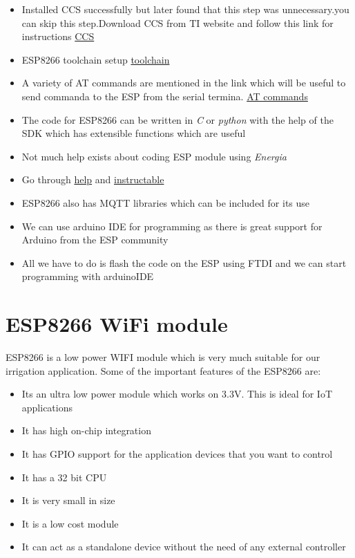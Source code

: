 \documentclass[16pt]{article}
\begin{document}
\begin{itemize}

\item
  Installed CCS successfully but later found that this step was unnecessary.you can skip this step.Download CCS from TI website and follow this link for instructions
  {\color{red}\href{http://processors.wiki.ti.com/index.php/Linux_Host_Support_CCSv6}{CCS}}
\item ESP8266 toolchain setup   {\color{red}\href{https://github.com/esp8266/esp8266-wiki/wiki/Toolchain}{toolchain}}
\item
  A variety of AT commands are mentioned in the link which will be
  useful to send commanda to the ESP from the serial termina. \href{https://nurdspace.nl/ESP8266#AT_Commands}{AT commands}
\item
  The code for ESP8266 can be written in \emph{C} or \emph{python} with
  the help of the SDK which has extensible functions which are useful
\item
  Not much help exists about coding ESP module using \emph{Energia}
\item Go through {\color{red}\href{http://hackaday.com/2014/12/08/compiling-your-own-programs-for-the-esp8266/}{help}} and {\color{red}\href{http://www.instructables.com/id/ESP8266-mini-Tutorial/}{instructable}}
\item
  ESP8266 also has MQTT libraries which can be included for its use
\item
  We can use arduino IDE for programming as there is great support for
  Arduino from the ESP community
\item
  All we have to do is flash the code on the ESP using FTDI and we can
  start programming with arduinoIDE
  
\end{itemize}


\vspace{12cm}
\section{ESP8266 WiFi module}

\vspace{0.5cm}

ESP8266 is a low power WIFI module which is very much suitable for our
irrigation application. Some of the important features of the ESP8266
are:


\begin{itemize}

\item
  Its an ultra low power module which works on 3.3V. This is ideal for
  IoT applications
\item
  It has high on-chip integration
\item
  It has GPIO support for the application devices that you want to
  control
\item
  It has a 32 bit CPU
\item
  It is very small in size
\item
  It is a low cost module
\item
  It can act as a standalone device without the need of any external
  controller
\end{itemize}
\end{document}
